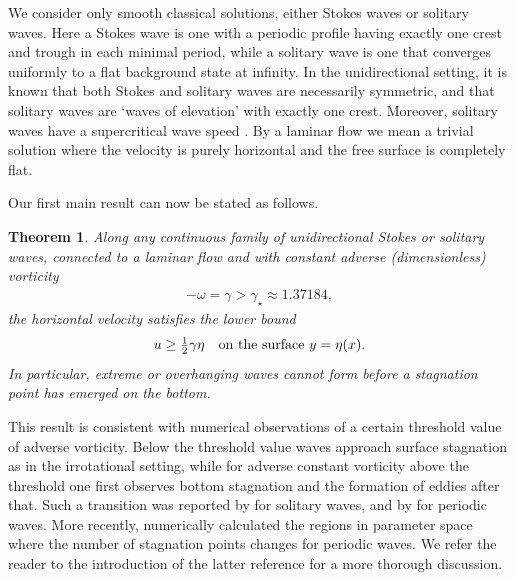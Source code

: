 \documentclass[pdflatex,sn-mathphys-num]{sn-jnl}%
\numberwithin{equation}{section}
\theoremstyle{thmstyleone}
\newtheorem{theorem}{Theorem}
\begin{document}
We consider only smooth classical solutions, either Stokes waves or solitary waves. Here a Stokes wave is one with a periodic profile having exactly one crest and trough in each minimal period, while a solitary wave is one that converges uniformly to a flat background state at infinity. In the unidirectional setting, it is known that both Stokes \cite{ConstantinEscher04b,ConstantinEhrnstromWahlen06,Hur07} and solitary \cite{Hur08, Kozlov2021} waves are necessarily symmetric, and that solitary waves are `waves of elevation' with exactly one crest. Moreover, solitary waves have a supercritical wave speed \cite{Keady1978, Wheeler15, Kozlov2021}. By a laminar flow we mean a trivial solution where the velocity is purely horizontal and the free surface is completely flat.

Our first main result can now be stated as follows.

\begin{theorem}\label{thm:main}
  Along any continuous family of unidirectional Stokes or solitary waves, connected to a laminar flow and with constant adverse (dimensionless) vorticity
  \begin{align*}
    -\omega = \gamma > \gamma_\star\approx 1.37184,
  \end{align*}
  the horizontal velocity satisfies the lower bound
  \begin{equation} \label{thm:main:psiy}
    u \geq \tfrac12 \gamma \eta 
    \quad
    \textup{on the surface $y=\eta(x)$}.
  \end{equation}
  In particular, extreme or overhanging waves cannot form before a stagnation point has emerged on the bottom.
\end{theorem}

This result is consistent with numerical observations of a certain threshold value of adverse vorticity. Below the threshold value waves approach surface stagnation as in the irrotational setting, while for adverse constant vorticity above the threshold one first observes bottom stagnation and the formation of eddies after that. Such a transition was reported by \cite{Teles-daSilvaPeregrine88} for solitary waves, and by \cite{Ko08large,Ko08effect} for periodic waves. More recently, \cite{Ribeiro17} numerically calculated the regions in parameter space where the number of stagnation points changes for periodic waves. We refer the reader to the introduction of the latter reference for a more thorough discussion.

\end{document}
